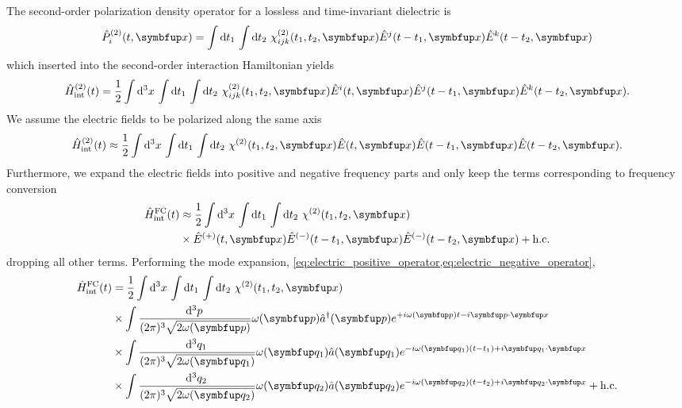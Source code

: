 The second-order polarization density operator for a lossless and time-invariant dielectric is
\begin{equation}
	\hat{P}_i^{(2)}(t,\vb{x})
	=
	\int\dd{t_1}
	\int\dd{t_2}
	\chi^{(2)}_{ijk}(t_1,t_2,\vb{x})
	\hat{E}^j(t-t_1,\vb{x})
	\hat{E}^k(t-t_2,\vb{x})
\end{equation}
which inserted into the second-order interaction Hamiltonian yields
\begin{equation}
	\hat{H}_\text{int}^{(2)}(t)
	=
	\frac{1}{2}
	\int\dd[3]{x}
	\int\dd{t_1}
	\int\dd{t_2}
	\chi^{(2)}_{ijk}(t_1,t_2,\vb{x})
	\hat{E}^i(t,\vb{x})
	\hat{E}^j(t-t_1,\vb{x})
	\hat{E}^k(t-t_2,\vb{x})
	.
\end{equation}
We assume the electric fields to be polarized along the same axis
\begin{equation}
	\hat{H}_\text{int}^{(2)}(t)
	\approx
	\frac{1}{2}
	\int\dd[3]{x}
	\int\dd{t_1}
	\int\dd{t_2}
	\chi^{(2)}(t_1,t_2,\vb{x})
	\hat{E}(t,\vb{x})
	\hat{E}(t-t_1,\vb{x})
	\hat{E}(t-t_2,\vb{x})
	.
\end{equation}
Furthermore, we expand the electric fields into positive and negative frequency parts and only keep the terms corresponding to frequency conversion
\begin{equation}
	\begin{split}
		\hat{H}_\text{int}^\text{FC}(t)
		&\approx
		\frac{1}{2}
		\int\dd[3]{x}
		\int\dd{t_1}
		\int\dd{t_2}
		\chi^{(2)}(t_1,t_2,\vb{x})
		\\
		&\times
		\hat{E}^{(+)}(t,\vb{x})
		\hat{E}^{(-)}(t-t_1,\vb{x})
		\hat{E}^{(-)}(t-t_2,\vb{x})
		+
		\text{h.c.}
	\end{split}
\end{equation}
dropping all other terms.
Performing the mode expansion, \cref{eq:electric_positive_operator,eq:electric_negative_operator},
\begin{equation}
	\begin{split}
		\hat{H}_\text{int}^\text{FC}(t)
		&=
		\frac{1}{2}
		\int\dd[3]{x}
		\int\dd{t_1}
		\int\dd{t_2}
		\chi^{(2)}(t_1,t_2,\vb{x})
		\\
		&\times
		\int\frac{\dd[3]{p}}{(2\pi)^3\sqrt{2\omega(\vb{p})}}
		\omega(\vb{p})
		\hat{a}^\dagger(\vb{p})
		e^{+i\omega(\vb{p})t-i\vb{p}\vdot\vb{x}}
		\\
		&\times
		\int\frac{\dd[3]{q_1}}{(2\pi)^3\sqrt{2\omega(\vb{q}_1)}}
		\omega(\vb{q}_1)
		\hat{a}(\vb{q}_1)
		e^{-i\omega(\vb{q}_1)(t-t_1)+i\vb{q}_1\vdot\vb{x}}
		\\
		&\times
		\int\frac{\dd[3]{q_2}}{(2\pi)^3\sqrt{2\omega(\vb{q}_2)}}
		\omega(\vb{q}_2)
		\hat{a}(\vb{q}_2)
		e^{-i\omega(\vb{q}_2)(t-t_2)+i\vb{q}_2\vdot\vb{x}}
		+
		\text{h.c.}
	\end{split}
\end{equation}
